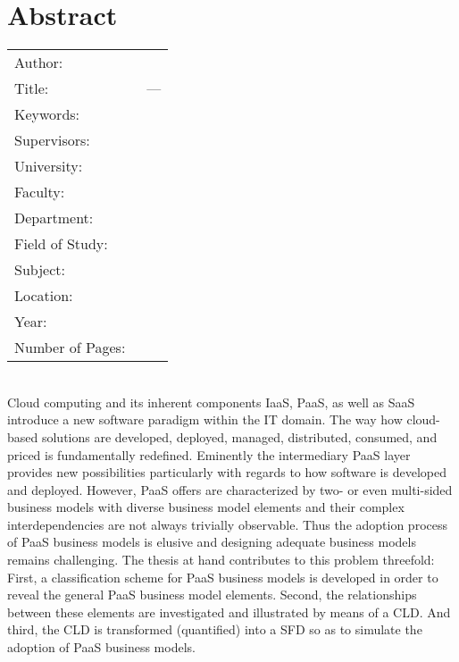 \chapter*{Abstract}
\thispagestyle{empty}

\begin{comment}
	Author: \myName\\
	Title: \myTitle ~--- \mySubtitle\\
	\myLocation : \myUni , \myTime , \pageref{LastPage} p.\\
	\myDegree , \mySubject\\
	Supervisors: \mySupervisor\\
\end{comment}

\noindent \hspace{-3mm}
\begin{tabular}{L{.23\textwidth}L{.75\textwidth}}
	Author: & \myName \\
	Title: & \myTitle ~--- \mySubtitle \\
	Keywords: & \myKeywords \\
	Supervisors: &\mySupervisor \\
	University: & \myUni \\
	Faculty: & \myFaculty \\
	Department: & \myDepartment \\
	Field of Study: & \myDegree \\ 
	Subject: & \mySubject\\
	Location: & \myLocation \\
	Year: & \myTime \\
	Number of Pages: & \pageref{LastPage}
\end{tabular}

~\\

\noindent
Cloud computing and its inherent components \ac{IaaS}, \ac{PaaS}, as well as \ac{SaaS} introduce a new software paradigm within the \ac{IT} domain. The way how cloud-based solutions are developed, deployed, managed, distributed, consumed, and priced is fundamentally redefined. Eminently the intermediary \ac{PaaS} layer provides new possibilities particularly with regards to how software is developed and deployed. However, \ac{PaaS} offers are characterized by two- or even multi-sided business models with diverse business model elements and their complex interdependencies are not always trivially observable. Thus the adoption process of \ac{PaaS} business models is elusive and designing adequate business models remains challenging. The thesis at hand contributes to this problem threefold: First, a classification scheme for \ac{PaaS} business models is developed in order to reveal the general \ac{PaaS} business model elements. Second, the relationships between these elements are investigated and illustrated by means of a \ac{CLD}. And third, the \ac{CLD} is transformed (quantified) into a \ac{SFD} so as to simulate the adoption of \ac{PaaS} business models. 